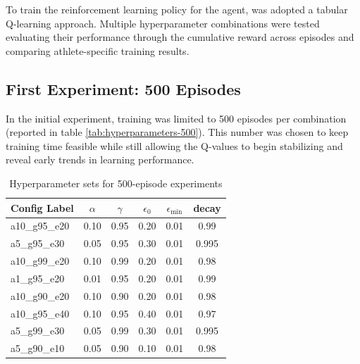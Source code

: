 
To train the reinforcement learning policy for the agent, was adopted a tabular Q-learning approach. Multiple hyperparameter combinations were tested evaluating their performance through the cumulative reward across episodes and comparing athlete-specific training results.

\subsection{First Experiment: 500 Episodes}
In the initial experiment, training was limited to 500 episodes per combination (reported in table \ref{tab:hyperparameters-500}). This number was chosen to keep training time feasible while still allowing the Q-values to begin stabilizing and reveal early trends in learning performance.

\begin{table}[h!]
  \centering
  \begin{tabular}{l c c c c c}
    \toprule
    \textbf{Config Label} & $\alpha$ & $\gamma$ & $\epsilon_0$ & $\epsilon_{\min}$ & \textbf{decay} \\
    \midrule
    a10\_g95\_e20  & 0.10 & 0.95 & 0.20 & 0.01 & 0.99  \\
    a5\_g95\_e30   & 0.05 & 0.95 & 0.30 & 0.01 & 0.995 \\
    a10\_g99\_e20  & 0.10 & 0.99 & 0.20 & 0.01 & 0.98  \\
    a1\_g95\_e20   & 0.01 & 0.95 & 0.20 & 0.01 & 0.99  \\
    a10\_g90\_e20  & 0.10 & 0.90 & 0.20 & 0.01 & 0.98  \\
    a10\_g95\_e40  & 0.10 & 0.95 & 0.40 & 0.01 & 0.97  \\
    a5\_g99\_e30   & 0.05 & 0.99 & 0.30 & 0.01 & 0.995 \\
    a5\_g90\_e10   & 0.05 & 0.90 & 0.10 & 0.01 & 0.98  \\
    \bottomrule
  \end{tabular}
  \caption{Hyperparameter sets for 500-episode experiments}
  \label{tab:hp-500}
\end{table}


